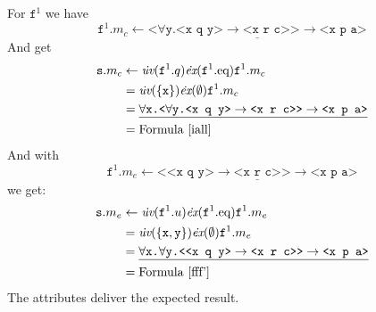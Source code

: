 For $\texttt{f}^1$ we have \[\texttt{f}^1.m_c\leftarrow \underline{\texttt{<}\forall \texttt{y.<x q y>}\rightarrow\texttt{<x r c>{}>}\rightarrow \texttt{<x p a>}}\]
And get
\begin{align*}
\notag \texttt{s}.m_c&\leftarrow \dot{\textit{uv}}(\texttt{f}^1.q) \dot{\textit{ex}}(\texttt{f}^1.\text{eq}) \texttt{f}^1.m_c\\
\notag &=\dot{\textit{uv}}(\{\texttt{x}\}) \dot{\textit{ex}}(\emptyset) \texttt{f}^1.m_c\\
\notag &= \underline{\forall \texttt{x.}\texttt{<}\forall \texttt{y.<x q y>}\rightarrow\texttt{<x r c>{}>}\rightarrow\texttt{<x p a>}}\\
\notag &= \text{Formula~\ref{iall}}
\end{align*}
And with \[\texttt{f}^1.m_e\leftarrow \underline{\texttt{<{}<x q y>}\rightarrow\texttt{<x r c>{}>}\rightarrow\texttt{<x p a>}}\]
we get:
\begin{align*}
\notag \texttt{s}.m_e&\leftarrow \dot{\textit{uv}}(\texttt{f}^1.u) \dot{\textit{ex}}(\texttt{f}^1.\text{eq}) \texttt{f}^1.m_e\\
\notag &=\dot{\textit{uv}}(\{\texttt{x}, \texttt{y}\}) \dot{\textit{ex}}(\emptyset) \texttt{f}^1.m_e\\
\notag &= \underline{\forall \texttt{x.}\forall\texttt{y.}\texttt{<{}<x q y>}\rightarrow\texttt{<x r c>{}>}\rightarrow \texttt{<x p a>}}\\
\notag &= \text{Formula~\ref{fff'}}
\end{align*}
The attributes deliver the expected result.


